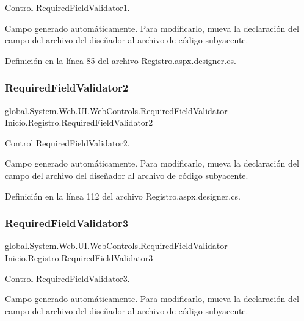 Control Required\+Field\+Validator1. 

Campo generado automáticamente. Para modificarlo, mueva la declaración del campo del archivo del diseñador al archivo de código subyacente. 

Definición en la línea 85 del archivo Registro.\+aspx.\+designer.\+cs.

\mbox{\label{classInicio_1_1Registro_a315fe7dd04ad883d4acd03f25fb7c1e9}} 
\subsubsection{\texorpdfstring{RequiredFieldValidator2}{RequiredFieldValidator2}}
{\footnotesize\ttfamily global.\+System.\+Web.\+U\+I.\+Web\+Controls.\+Required\+Field\+Validator Inicio.\+Registro.\+Required\+Field\+Validator2\hspace{0.3cm}{\ttfamily [protected]}}



Control Required\+Field\+Validator2. 

Campo generado automáticamente. Para modificarlo, mueva la declaración del campo del archivo del diseñador al archivo de código subyacente. 

Definición en la línea 112 del archivo Registro.\+aspx.\+designer.\+cs.

\mbox{\label{classInicio_1_1Registro_a24b35dd88cea1b27e18e681d9f1bd24a}} 
\subsubsection{\texorpdfstring{RequiredFieldValidator3}{RequiredFieldValidator3}}
{\footnotesize\ttfamily global.\+System.\+Web.\+U\+I.\+Web\+Controls.\+Required\+Field\+Validator Inicio.\+Registro.\+Required\+Field\+Validator3\hspace{0.3cm}{\ttfamily [protected]}}



Control Required\+Field\+Validator3. 

Campo generado automáticamente. Para modificarlo, mueva la declaración del campo del archivo del diseñador al archivo de código subyacente. 

